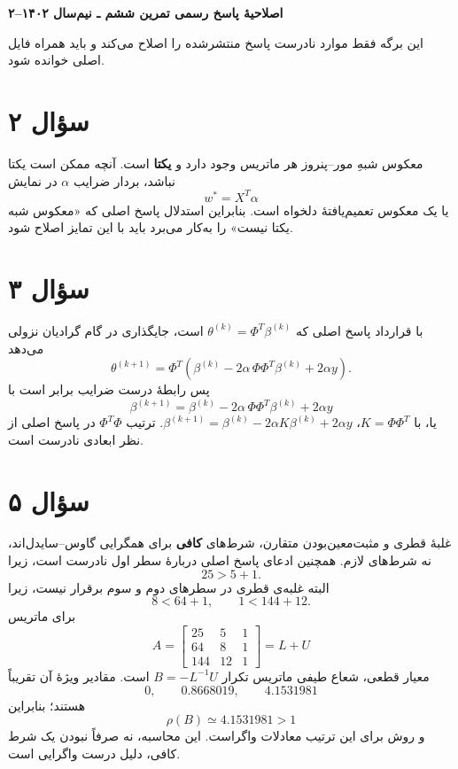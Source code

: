 \documentclass[12pt]{article}
\begin{document}
\begin{center}
  {\Large\textbf{اصلاحیهٔ پاسخ رسمی تمرین ششم ـ نیم‌سال ۱۴۰۲--۲}}
\end{center}

این برگه فقط موارد نادرست پاسخ منتشرشده را اصلاح می‌کند و باید همراه فایل اصلی خوانده شود.

\section*{سؤال ۲}
معکوس شبهِ مور--پنروز هر ماتریس وجود دارد و \textbf{یکتا} است. آنچه ممکن است یکتا نباشد، بردار ضرایب \(\alpha\) در نمایش
\[
  w^*=X^{T}\alpha
\]
یا یک معکوس تعمیم‌یافتهٔ دلخواه است. بنابراین استدلال پاسخ اصلی که «معکوس شبه یکتا نیست» را به‌کار می‌برد باید با این تمایز اصلاح شود.

\section*{سؤال ۳}
با قرارداد پاسخ اصلی که
\(\theta^{(k)}=\Phi^T\beta^{(k)}\)
است، جایگذاری در گام گرادیان نزولی می‌دهد
\[
 \theta^{(k+1)}
 =\Phi^T\!\left(
 \beta^{(k)}
 -2\alpha\,\Phi\Phi^T\beta^{(k)}
 +2\alpha y
 \right).
\]
پس رابطهٔ درست ضرایب برابر است با
\[
  \boxed{\;
  \beta^{(k+1)}
  =\beta^{(k)}
  -2\alpha\,\Phi\Phi^T\beta^{(k)}
  +2\alpha y
  \;}
\]
یا، با \(K=\Phi\Phi^T\)،
\(\beta^{(k+1)}=\beta^{(k)}-2\alpha K\beta^{(k)}+2\alpha y\).
ترتیب \(\Phi^T\Phi\) در پاسخ اصلی از نظر ابعادی نادرست است.

\section*{سؤال ۵}
غلبهٔ قطری و مثبت‌معین‌بودن متقارن، شرط‌های \textbf{کافی} برای همگرایی گاوس--سایدل‌اند، نه شرط‌های لازم. همچنین ادعای پاسخ اصلی دربارهٔ سطر اول نادرست است، زیرا
\[
  25>5+1.
\]
البته غلبه‌ی قطری در سطرهای دوم و سوم برقرار نیست، زیرا
\[
  8<64+1,
  \qquad
  1<144+12.
\]
برای ماتریس
\[
 A=\begin{bmatrix}
 25&5&1\\
 64&8&1\\
 144&12&1
 \end{bmatrix}=L+U
\]
معیار قطعی، شعاع طیفی ماتریس تکرار
\(B=-L^{-1}U\)
است. مقادیر ویژهٔ آن تقریباً
\[
  0,\qquad 0.8668019,\qquad 4.1531981
\]
هستند؛ بنابراین
\[
  \rho(B)\simeq4.1531981>1
\]
و روش برای این ترتیب معادلات واگراست. این محاسبه، نه صرفاً نبودن یک شرط کافی، دلیل درست واگرایی است.
\end{document}
